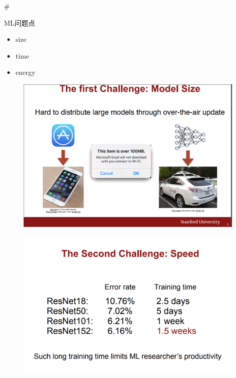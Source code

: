 \documentclass[11pt]{article}
\makeatletter
\def\maxwidth{\ifdim\Gin@nat@width>\linewidth\linewidth
    \else\Gin@nat@width\fi}
\let\Oldincludegraphics\includegraphics
\renewcommand{\includegraphics}[1]{\Oldincludegraphics[width=.8\maxwidth]{#1}}
\providecommand{\tightlist}{%
      \setlength{\itemsep}{0pt}\setlength{\parskip}{0pt}}
\makeatother
\begin{document}
    \#

ML问题点

\begin{itemize}
\tightlist
\item
  size
\item
  time
\item
  energy
\end{itemize}

    \begin{figure}
\centering
\includegraphics{ml_problem1.png}
\caption{}
\end{figure}

    \begin{figure}
\centering
\includegraphics{ml_problem2.png}
\caption{}
\end{figure}
\end{document}

